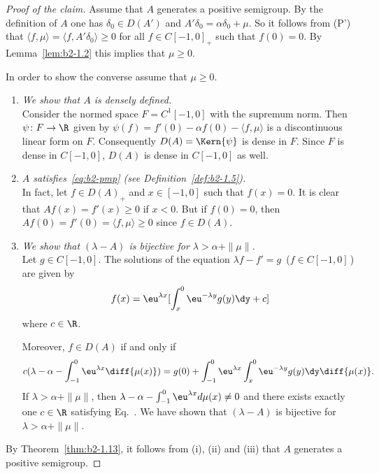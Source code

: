 \begin{proof}[Proof of the claim]
Assume that $A$ generates a positive semigroup.
By the definition of\/ $A$ one has $\delta_{0} \in D(A')$ and $A'\delta_{0} = \alpha\delta_{0} + \mu$.
So it follows from (P') that $\langle f,\mu \rangle = \langle f,A'\delta_{0} \rangle \geq 0$ for all $f \in C[-1,0]_{+}$ such that $f(0) = 0$.
By Lemma~\ref{lem:b2-1.2}
this implies that $\mu \geq 0$.

In order to show the converse assume that $\mu \geq 0$.
\begin{enumerate}[\upshape(i), wide, labelindent=.25em]

\item
\textit{We show that $A$ is densely defined.}\\
Consider the normed space $F = C^{1}[-1,0]$ with the supremum norm.
Then $\psi \colon F \to \R$ given by 
$\psi(f) = f'(0) - \alpha f(0) - \langle f,\mu \rangle$ 
is a discontinuous linear form on $F$.
Consequently $D(A) = \Kern{\psi}$ is dense in $F$.
Since $F$ is dense in $C[-1,0]$, $D(A)$ is dense in $C[-1,0]$ as well.

\item
\textit{$A$ satisfies~\eqref{eq:b2-pmp} (see Definition~\ref{def:b2-1.5}).}\\
In fact, let $f \in D(A)_{+}$ and $x \in [-1,0]$ such that $f(x) = 0$.
It is clear that $Af(x) = f'(x) \geq 0$ if\/ $x < 0$.
But if\/ $f(0) = 0$, then $Af(0) = f'(0) = \langle f,\mu \rangle \geq 0$ since $f \in D(A)$.

\item
\textit{We show that $(\lambda-A)$ is bijective for $\lambda > \alpha + \|\mu\|$.}\\
Let $g \in C[-1,0]$.
The solutions of the equation $\lambda f - f' = g$ \,($f \in C[-1,0]$\,) are given by 
%
\[
	f(x) = \eu^{\lambda x}[\int_{x}^{0} \eu^{-\lambda y} g(y) \dy + c] 
\]
%
where $c \in \R$.

Moreover, $f \in D(A)$ if and only if
\begin{equation}\label{eq:b2-1.13}
c(\lambda - \alpha - \int_{-1}^{0} \eu^{\lambda x} \diff{\mu(x)}) = g(0) + \int_{-1}^{0} \eu^{\lambda x} \int_{x}^{0}\eu^{-\lambda y} g(y) \dy\diff{\mu(x)}.
\end{equation}
If\/ $\lambda > \alpha + \|\mu\|$, then $\lambda - \alpha - \int_{-1}^{0} \eu^{\lambda x} d\mu(x) \neq 0$ and there exists exactly one $c \in \R$ satisfying Eq.~.
We have shown that $(\lambda- A)$ is bijective for $\lambda > \alpha + \|\mu\|$.

\end{enumerate}
By Theorem~\ref{thm:b2-1.13}, it follows from \upshape(i), \upshape(ii) and \upshape(iii) that $A$ generates a positive semigroup.
\end{proof}
